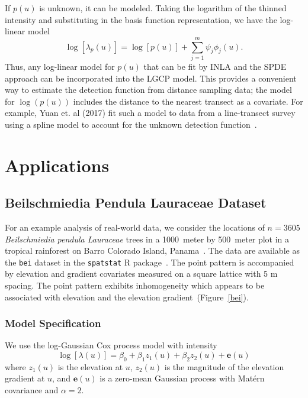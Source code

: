 \documentclass[]{interact}
\begin{document}
If \(p(u)\) is unknown, it can be modeled. Taking the logarithm of
the thinned intensity and substituting in the basis function representation,
we have the log-linear model
\begin{displaymath}
\log\left[\lambda_{p}(u)\right]
= \log\left[p(u)\right] + \sum_{j = 1}^{m} \psi_{j} \phi_{j}(u).
\end{displaymath}
Thus, any log-linear model for \(p(u)\) that can be fit by INLA and the SPDE
approach can be incorporated into the LGCP model. This provides a convenient
way to estimate the detection function from distance sampling data; the model
for \(\log(p(u))\) includes the distance to the nearest transect as a
covariate. For example, Yuan et. al (2017) fit such a model to data from a
line-transect survey using a spline model to account for the unknown detection
function~\cite{yuanetal}.


\section{Applications}
\label{application}


\subsection{Beilschmiedia Pendula Lauraceae Dataset}
\label{beianalysis}

For an example analysis of real-world data, we consider the locations of
\(n = 3605\) \emph{Beilschmiedia pendula Lauraceae} trees in a 1000~meter by
500~meter plot in a tropical rainforest on Barro Colorado Island,
Panama~\cite{moellerwaagepetersen}. The data are available as the \texttt{bei}
dataset in the \texttt{spatstat} R package~\cite{spatstat}. The point pattern
is accompanied by elevation and gradient covariates measured on a square
lattice with 5 m spacing. The point pattern exhibits inhomogeneity which
appears to be associated with elevation and the elevation
gradient~(Figure~\ref{bei}).


\subsubsection{Model Specification}

We use the log-Gaussian Cox process model with intensity
\begin{displaymath}
\log\left[\lambda(u)\right] = \beta_{0} + \beta_{1} z_{1}(u)
+ \beta_{2} z_{2}(u) + \mathbf{e}(u)
\end{displaymath}
where \(z_{1}(u)\) is the elevation at \(u\), \(z_{2}(u)\) is the magnitude of
the elevation gradient at \(u\), and \(\mathbf{e}(u)\) is a zero-mean Gaussian
process with Mat\'{e}rn covariance and \(\alpha = 2\).
\end{document}
